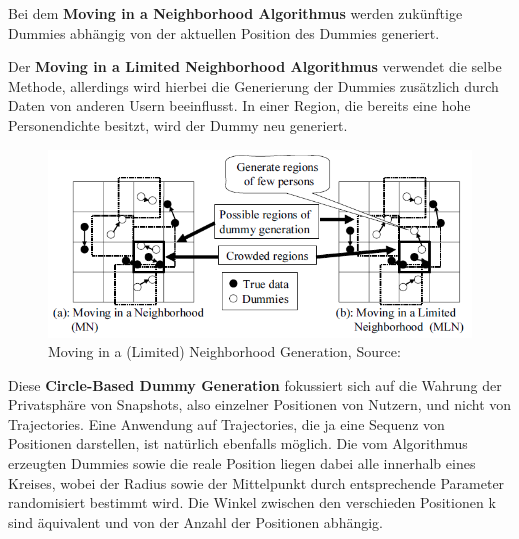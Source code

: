 Bei dem \textbf{Moving in a Neighborhood Algorithmus} \cite{Kido2005} werden zukünftige Dummies abhängig von der aktuellen Position des Dummies generiert.

Der \textbf{Moving in a Limited Neighborhood Algorithmus} \cite{Kido2005} verwendet die selbe Methode, allerdings wird hierbei die Generierung der Dummies zusätzlich durch Daten von anderen Usern beeinflusst. In einer Region, die bereits eine hohe Personendichte besitzt, wird der Dummy neu generiert.
\begin{figure}[!h]
	\centering
	\includegraphics[width=\linewidth]{Bilder/Kido2005DG.png}
	\caption{Moving in a (Limited) Neighborhood Generation, Source: \protect\cite{Kido2005}}
	\label{fig_Kido2005DG}
\end{figure}

Diese \textbf{Circle-Based Dummy Generation} \cite{Lu2008} fokussiert sich auf die Wahrung der Privatsphäre von Snapshots, also einzelner Positionen von Nutzern, und nicht von Trajectories. Eine Anwendung auf Trajectories, die ja eine Sequenz von Positionen darstellen, ist natürlich ebenfalls möglich. Die vom Algorithmus erzeugten Dummies sowie die reale Position liegen dabei alle innerhalb eines Kreises, wobei der Radius sowie der Mittelpunkt durch entsprechende Parameter randomisiert bestimmt wird. Die Winkel zwischen den verschieden Positionen k sind äquivalent und von der Anzahl der Positionen abhängig.


